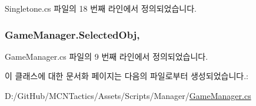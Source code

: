 Singletone.\+cs 파일의 18 번째 라인에서 정의되었습니다.

\subsubsection[{\texorpdfstring{Selected\+Obj}{SelectedObj}}]{ Game\+Manager.\+Selected\+Obj\hspace{0.3cm}{\ttfamily [get]}, {\ttfamily [set]}}\hypertarget{class_game_manager_a708d9fb61ea9f34e4c3a55d34c31acf2}{}\label{class_game_manager_a708d9fb61ea9f34e4c3a55d34c31acf2}


Game\+Manager.\+cs 파일의 9 번째 라인에서 정의되었습니다.



이 클래스에 대한 문서화 페이지는 다음의 파일로부터 생성되었습니다.\+:\begin{DoxyCompactItemize}
\item 
D\+:/\+Git\+Hub/\+M\+C\+N\+Tactics/\+Assets/\+Scripts/\+Manager/\hyperlink{_game_manager_8cs}{Game\+Manager.\+cs}\end{DoxyCompactItemize}
